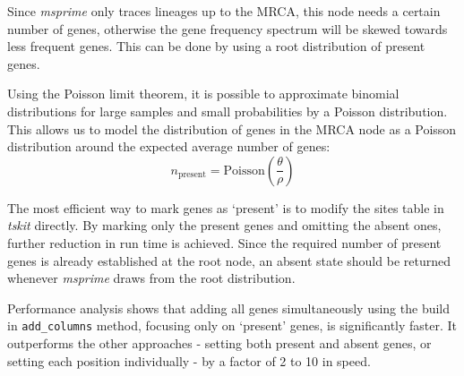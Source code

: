 Since \textit{msprime} only traces lineages up to the \ac{MRCA}, this node needs a certain number of genes, otherwise the gene frequency spectrum will be skewed towards less frequent genes.
This can be done by using a root distribution of present genes.

Using the Poisson limit theorem, it is possible to approximate binomial distributions for large samples and small probabilities by a Poisson distribution.
This allows us to model the distribution of genes in the \ac{MRCA} node as a Poisson distribution around the expected average number of genes:
\begin{equation}
    n_\text{present} = \text{Poisson}(\frac{\theta}{\rho})
\end{equation}

The most efficient way to mark genes as `present' is to modify the sites table in \textit{tskit} directly.
By marking only the present genes and omitting the absent ones, further reduction in run time is achieved.
Since the required number of present genes is already established at the root node, an absent state should be returned whenever \textit{msprime} draws from the root distribution.

Performance analysis shows that adding all genes simultaneously using the build in \texttt{add_columns} method, focusing only on `present' genes, is significantly faster.
It outperforms the other approaches - setting both present and absent genes, or setting each position individually - by a factor of 2 to 10 in speed.

